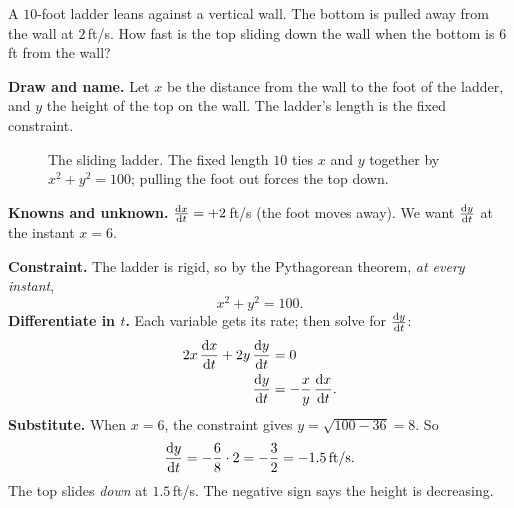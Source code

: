\begin{example}
\label{ch13:ex-ladder}
A $10$-foot ladder leans against a vertical wall. The bottom is pulled away from the wall at
$2$\,ft/s. How fast is the top sliding down the wall when the bottom is $6$\,ft from the wall?

\textbf{Draw and name.} Let $x$ be the distance from the wall to the foot of the ladder, and $y$ the
height of the top on the wall. The ladder's length is the fixed constraint.

\begin{figure}[H]
\centering
{}
\caption{The sliding ladder. The fixed length $10$ ties $x$ and $y$ together by
$x^2+y^2=100$; pulling the foot out forces the top down.}
\label{ch13:fig-ladder}
\end{figure}

\textbf{Knowns and unknown.} $\frac{\mathrm{d} x}{\mathrm{d} t} = +2$\,ft/s (the foot moves away). We want $\frac{\mathrm{d} y}{\mathrm{d} t}$ at the
instant $x=6$.

\textbf{Constraint.} The ladder is rigid, so by the Pythagorean theorem, \emph{at every instant},
\[
x^2 + y^2 = 100.
\]
\textbf{Differentiate in $t$.} Each variable gets its rate; then solve for $\frac{\mathrm{d} y}{\mathrm{d} t}$:
\begin{align*}
2x\,\frac{\mathrm{d} x}{\mathrm{d} t} + 2y\,\frac{\mathrm{d} y}{\mathrm{d} t} &= 0 \\
\frac{\mathrm{d} y}{\mathrm{d} t} &= -\frac{x}{y}\,\frac{\mathrm{d} x}{\mathrm{d} t}.
\end{align*}
\textbf{Substitute.} When $x=6$, the constraint gives $y = \sqrt{100-36} = 8$. So
\[
\frac{\mathrm{d} y}{\mathrm{d} t} = -\frac{6}{8}\cdot 2 = -\frac{3}{2} = -1.5\,\text{ft/s}.
\]
The top slides \emph{down} at $1.5$\,ft/s. The negative sign says the height is decreasing.
\end{example}

